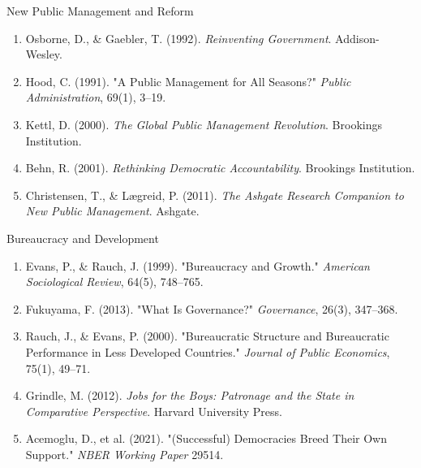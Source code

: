 \documentclass[10pt]{beamer}
\begin{document}
\begin{frame}{New Public Management and Reform}
\footnotesize
\begin{enumerate}
\item Osborne, D., \& Gaebler, T. (1992). \emph{Reinventing Government}. Addison-Wesley.
\item Hood, C. (1991). "A Public Management for All Seasons?" \emph{Public Administration}, 69(1), 3–19.
\item Kettl, D. (2000). \emph{The Global Public Management Revolution}. Brookings Institution.
\item Behn, R. (2001). \emph{Rethinking Democratic Accountability}. Brookings Institution.
\item Christensen, T., \& Lægreid, P. (2011). \emph{The Ashgate Research Companion to New Public Management}. Ashgate.
\end{enumerate}
\end{frame}

\begin{frame}{Bureaucracy and Development}
\footnotesize
\begin{enumerate}
\item Evans, P., \& Rauch, J. (1999). "Bureaucracy and Growth." \emph{American Sociological Review}, 64(5), 748–765.
\item Fukuyama, F. (2013). "What Is Governance?" \emph{Governance}, 26(3), 347–368.
\item Rauch, J., \& Evans, P. (2000). "Bureaucratic Structure and Bureaucratic Performance in Less Developed Countries." \emph{Journal of Public Economics}, 75(1), 49–71.
\item Grindle, M. (2012). \emph{Jobs for the Boys: Patronage and the State in Comparative Perspective}. Harvard University Press.
\item Acemoglu, D., et al. (2021). "(Successful) Democracies Breed Their Own Support." \emph{NBER Working Paper} 29514.
\end{enumerate}
\end{frame}
\end{document}
